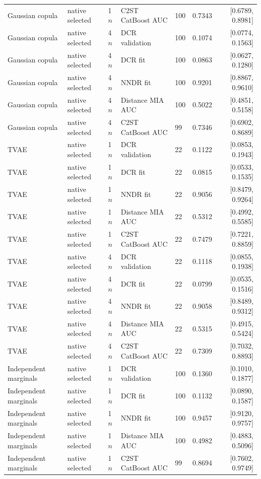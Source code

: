 \begin{longtable}{lllllrr}
Gaussian copula & native selected & 1$n$ & C2ST CatBoost AUC & 100 & 0.7343 & [0.6789, 0.8981] \\
Gaussian copula & native selected & 4$n$ & DCR validation & 100 & 0.1074 & [0.0774, 0.1563] \\
Gaussian copula & native selected & 4$n$ & DCR fit & 100 & 0.0863 & [0.0627, 0.1280] \\
Gaussian copula & native selected & 4$n$ & NNDR fit & 100 & 0.9201 & [0.8867, 0.9610] \\
Gaussian copula & native selected & 4$n$ & Distance MIA AUC & 100 & 0.5022 & [0.4851, 0.5158] \\
Gaussian copula & native selected & 4$n$ & C2ST CatBoost AUC & 99 & 0.7346 & [0.6902, 0.8689] \\
TVAE & native selected & 1$n$ & DCR validation & 22 & 0.1122 & [0.0853, 0.1943] \\
TVAE & native selected & 1$n$ & DCR fit & 22 & 0.0815 & [0.0533, 0.1535] \\
TVAE & native selected & 1$n$ & NNDR fit & 22 & 0.9056 & [0.8479, 0.9264] \\
TVAE & native selected & 1$n$ & Distance MIA AUC & 22 & 0.5312 & [0.4992, 0.5585] \\
TVAE & native selected & 1$n$ & C2ST CatBoost AUC & 22 & 0.7479 & [0.7221, 0.8859] \\
TVAE & native selected & 4$n$ & DCR validation & 22 & 0.1118 & [0.0855, 0.1938] \\
TVAE & native selected & 4$n$ & DCR fit & 22 & 0.0799 & [0.0535, 0.1516] \\
TVAE & native selected & 4$n$ & NNDR fit & 22 & 0.9058 & [0.8489, 0.9312] \\
TVAE & native selected & 4$n$ & Distance MIA AUC & 22 & 0.5315 & [0.4915, 0.5424] \\
TVAE & native selected & 4$n$ & C2ST CatBoost AUC & 22 & 0.7309 & [0.7032, 0.8893] \\
Independent marginals & native selected & 1$n$ & DCR validation & 100 & 0.1360 & [0.1010, 0.1877] \\
Independent marginals & native selected & 1$n$ & DCR fit & 100 & 0.1132 & [0.0890, 0.1587] \\
Independent marginals & native selected & 1$n$ & NNDR fit & 100 & 0.9457 & [0.9120, 0.9757] \\
Independent marginals & native selected & 1$n$ & Distance MIA AUC & 100 & 0.4982 & [0.4883, 0.5096] \\
Independent marginals & native selected & 1$n$ & C2ST CatBoost AUC & 99 & 0.8694 & [0.7602, 0.9749] \\

\end{longtable}
